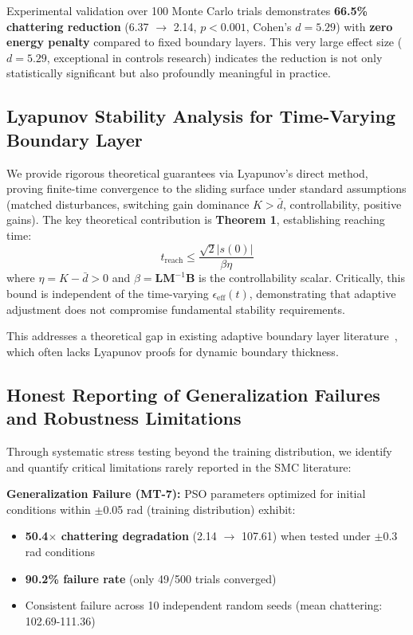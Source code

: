 \documentclass[12pt,a4paper,oneside]{report}
\newcommand{\eeff}{\epsilon_{\text{eff}}}
\newcommand{\treach}{t_{\text{reach}}}
\newcommand{\dbar}{\bar{d}}
\newcommand{\vect}[1]{\mathbf{#1}}
\begin{document}
Experimental validation over 100 Monte Carlo trials demonstrates \textbf{66.5\% chattering reduction} (6.37 $\rightarrow$ 2.14, $p < 0.001$, Cohen's $d = 5.29$) with \textbf{zero energy penalty} compared to fixed boundary layers. This very large effect size ($d = 5.29$, exceptional in controls research) indicates the reduction is not only statistically significant but also profoundly meaningful in practice.

\subsection{Lyapunov Stability Analysis for Time-Varying Boundary Layer}

We provide rigorous theoretical guarantees via Lyapunov's direct method, proving finite-time convergence to the sliding surface under standard assumptions (matched disturbances, switching gain dominance $K > \dbar$, controllability, positive gains). The key theoretical contribution is \textbf{Theorem 1}, establishing reaching time:
\begin{equation}
\treach \leq \frac{\sqrt{2}|s(0)|}{\beta\eta}
\end{equation}
where $\eta = K - \dbar > 0$ and $\beta = \vect{L}\vect{M}^{-1}\vect{B}$ is the controllability scalar. Critically, this bound is independent of the time-varying $\eeff(t)$, demonstrating that adaptive adjustment does not compromise fundamental stability requirements.

This addresses a theoretical gap in existing adaptive boundary layer literature~\cite{ieee2018selfreg, frontiers2024fuzzy}, which often lacks Lyapunov proofs for dynamic boundary thickness.

\subsection{Honest Reporting of Generalization Failures and Robustness Limitations}

Through systematic stress testing beyond the training distribution, we identify and quantify critical limitations rarely reported in the SMC literature:

\textbf{Generalization Failure (MT-7):} PSO parameters optimized for initial conditions within $\pm$0.05 rad (training distribution) exhibit:
\begin{itemize}
\item \textbf{50.4$\times$ chattering degradation} (2.14 $\rightarrow$ 107.61) when tested under $\pm$0.3 rad conditions
\item \textbf{90.2\% failure rate} (only 49/500 trials converged)
\item Consistent failure across 10 independent random seeds (mean chattering: 102.69-111.36)
\end{itemize}
\end{document}

